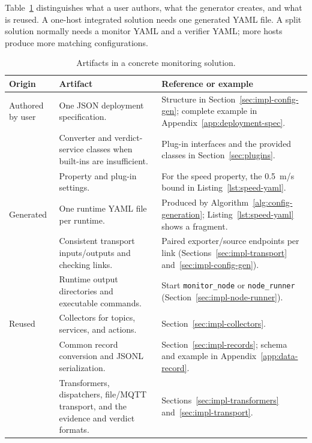 Table~\ref{tab:solution-artifacts} distinguishes what a user authors, what the
generator creates, and what is reused. A one-host integrated solution needs one
generated YAML file. A split solution normally needs a monitor YAML and a
verifier YAML; more hosts produce more matching configurations.

\begin{table}[htbp]
\centering
\caption{Artifacts in a concrete monitoring solution.}
\label{tab:solution-artifacts}
\begin{tabular}{
  >{\raggedright\arraybackslash}p{}
  >{\raggedright\arraybackslash}p{}
  >{\raggedright\arraybackslash}p{}}
\toprule
\textbf{Origin} & \textbf{Artifact} & \textbf{Reference or example}\\
\midrule
Authored by user & One JSON deployment specification. &
Structure in Section~\ref{sec:impl-config-gen}; complete example in
Appendix~\ref{app:deployment-spec}.\\
\addlinespace[3pt]
& Converter and verdict-service classes when built-ins are insufficient. &
Plug-in interfaces and the provided classes in Section~\ref{sec:plugins}.\\
\addlinespace[3pt]
& Property and plug-in settings. &
For the speed property, the 0.5~m/s bound in
Listing~\ref{lst:speed-yaml}.\\
\addlinespace[8pt]
Generated & One runtime YAML file per runtime. &
Produced by Algorithm~\ref{alg:config-generation};
Listing~\ref{lst:speed-yaml} shows a fragment.\\
\addlinespace[3pt]
& Consistent transport inputs/outputs and checking links. &
Paired exporter/source endpoints per link
(Sections~\ref{sec:impl-transport} and~\ref{sec:impl-config-gen}).\\
\addlinespace[3pt]
& Runtime output directories and executable commands. &
Start \texttt{monitor\_node} or \texttt{node\_runner}
(Section~\ref{sec:impl-node-runner}).\\
\addlinespace[8pt]
Reused & Collectors for topics, services, and actions. &
Section~\ref{sec:impl-collectors}.\\
\addlinespace[3pt]
& Common record conversion and JSONL serialization. &
Section~\ref{sec:impl-records}; schema and example in
Appendix~\ref{app:data-record}.\\
\addlinespace[3pt]
& Transformers, dispatchers, file/MQTT transport, and the evidence and
verdict formats. &
Sections~\ref{sec:impl-transformers} and~\ref{sec:impl-transport}.\\
\bottomrule
\end{tabular}
\end{table}

